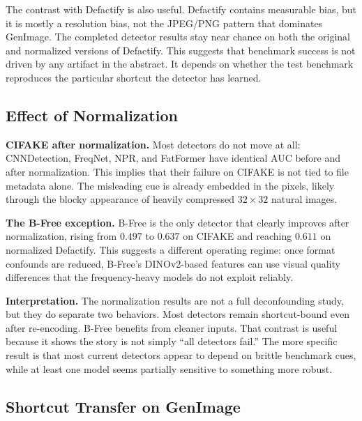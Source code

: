 The contrast with Defactify is also useful.
Defactify contains measurable bias, but it is mostly a resolution bias, not the JPEG/PNG pattern that dominates GenImage.
The completed detector results stay near chance on both the original and normalized versions of Defactify.
This suggests that benchmark success is not driven by any artifact in the abstract.
It depends on whether the test benchmark reproduces the particular shortcut the detector has learned.

\subsection{Effect of Normalization}
\label{sec:norm_results}

\noindent\textbf{CIFAKE after normalization.}
Most detectors do not move at all: CNNDetection, FreqNet, NPR, and FatFormer have identical AUC before and after normalization.
This implies that their failure on CIFAKE is not tied to file metadata alone.
The misleading cue is already embedded in the pixels, likely through the blocky appearance of heavily compressed $32\times32$ natural images.

\noindent\textbf{The B-Free exception.}
B-Free is the only detector that clearly improves after normalization, rising from $0.497$ to $0.637$ on CIFAKE and reaching $0.611$ on normalized Defactify.
This suggests a different operating regime: once format confounds are reduced, B-Free's DINOv2-based features can use visual quality differences that the frequency-heavy models do not exploit reliably.

\noindent\textbf{Interpretation.}
The normalization results are not a full deconfounding study, but they do separate two behaviors.
Most detectors remain shortcut-bound even after re-encoding.
B-Free benefits from cleaner inputs.
That contrast is useful because it shows the story is not simply ``all detectors fail.''
The more specific result is that most current detectors appear to depend on brittle benchmark cues, while at least one model seems partially sensitive to something more robust.

\subsection{Shortcut Transfer on GenImage}
\label{sec:genimage_results}

